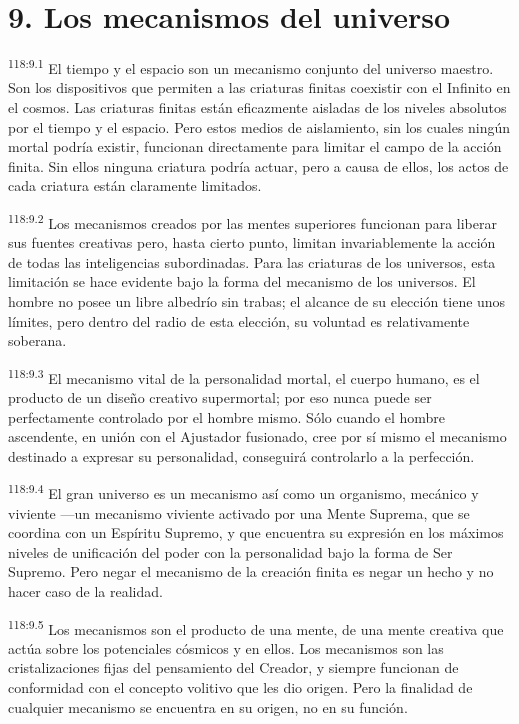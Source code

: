 \documentclass[twoside, 11pt]{book}
\begin{document}
\section*{9. Los mecanismos del universo}
\par
\textsuperscript{118:9.1} El tiempo y el espacio son un mecanismo conjunto del universo maestro. Son los dispositivos que permiten a las criaturas finitas coexistir con el Infinito en el cosmos. Las criaturas finitas están eficazmente aisladas de los niveles absolutos por el tiempo y el espacio. Pero estos medios de aislamiento, sin los cuales ningún mortal podría existir, funcionan directamente para limitar el campo de la acción finita. Sin ellos ninguna criatura podría actuar, pero a causa de ellos, los actos de cada criatura están claramente limitados.

\par
\textsuperscript{118:9.2} Los mecanismos creados por las mentes superiores funcionan para liberar sus fuentes creativas pero, hasta cierto punto, limitan invariablemente la acción de todas las inteligencias subordinadas. Para las criaturas de los universos, esta limitación se hace evidente bajo la forma del mecanismo de los universos. El hombre no posee un libre albedrío sin trabas; el alcance de su elección tiene unos límites, pero dentro del radio de esta elección, su voluntad es relativamente soberana.

\par
\textsuperscript{118:9.3} El mecanismo vital de la personalidad mortal, el cuerpo humano, es el producto de un diseño creativo supermortal; por eso nunca puede ser perfectamente controlado por el hombre mismo. Sólo cuando el hombre ascendente, en unión con el Ajustador fusionado, cree por sí mismo el mecanismo destinado a expresar su personalidad, conseguirá controlarlo a la perfección.

\par
\textsuperscript{118:9.4} El gran universo es un mecanismo así como un organismo, mecánico y viviente ---un mecanismo viviente activado por una Mente Suprema, que se coordina con un Espíritu Supremo, y que encuentra su expresión en los máximos niveles de unificación del poder con la personalidad bajo la forma de Ser Supremo. Pero negar el mecanismo de la creación finita es negar un hecho y no hacer caso de la realidad.

\par
\textsuperscript{118:9.5} Los mecanismos son el producto de una mente, de una mente creativa que actúa sobre los potenciales cósmicos y en ellos. Los mecanismos son las cristalizaciones fijas del pensamiento del Creador, y siempre funcionan de conformidad con el concepto volitivo que les dio origen. Pero la finalidad de cualquier mecanismo se encuentra en su origen, no en su función.
\end{document}
